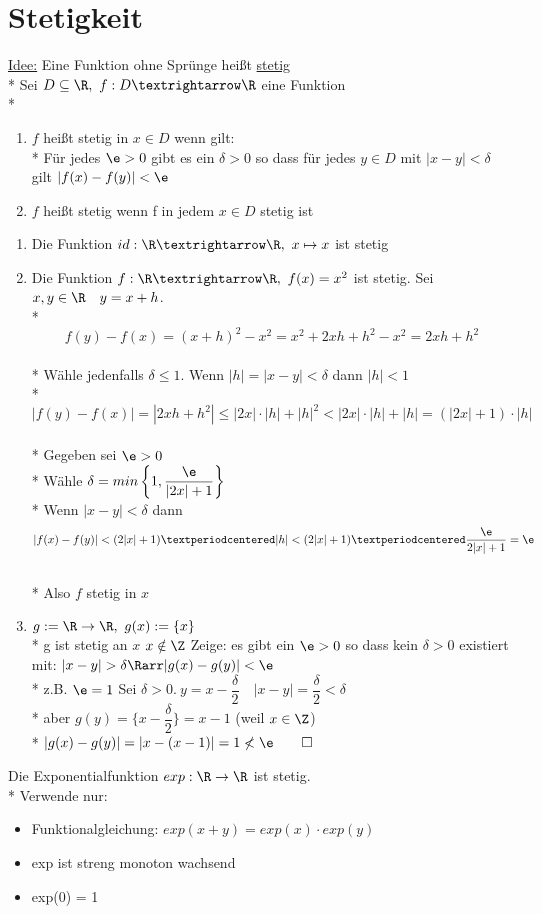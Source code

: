 \chapter{Stetigkeit}
\ul{Idee:} Eine Funktion ohne Sprünge heißt \ul{stetig}\\*
Sei $D\subseteq \R,\ f:D→\R$ eine Funktion\\*
\begin{enumerate}
\item{$f$ heißt stetig in $x\in D$ wenn gilt:\\*
Für jedes $\e>0$ gibt es ein $\delta>0$ so dass für jedes $y\in D$ mit $|x-y|<\delta$ gilt $|f(x)-f(y)|<\e$ %
}
\item{$f$ heißt stetig wenn f in jedem $x\in D$ stetig ist}
\end{enumerate}
\begin{enumerate}
\item{Die Funktion $id:\R→\R,\ x\mapsto x$ ist stetig}
\item{Die Funktion $f:\R→\R,\ f(x)=x^2$ ist stetig. %
\bew
Sei $x,y\in\R\quad y=x+h$.\\*
$$f(y)-f(x)=(x+h)^2-x^2=x^2+2xh+h^2-x^2=2xh+h^2$$\\*
Wähle jedenfalls $\delta\leq 1$. Wenn $|h|=|x-y|<\delta$ dann $|h|<1$\\*
$$|f(y)-f(x)|=|2xh+h^2|\leq|2x|·|h|+|h|^2<|2x|·|h|+|h|=(|2x|+1)·|h|$$\\*
Gegeben sei $\e>0$\\*
Wähle $\delta=min\left\{1,\dfrac{\e}{|2x|+1}\right\}$\\*
Wenn $|x-y|<\delta$ dann $$|f(x)-f(y)|<(2|x|+1)·|h|<(2|x|+1)·\dfrac{\e}{2|x|+1}=\e$$\\*
Also $f$ stetig in $x$}
\item{$g:=\R \to \R,\ g(x):=\{x\}$\\*
g ist stetig an $x$ \equ $x\notin\Z$
Zeige: es gibt ein $\e>0$ so dass kein $\delta>0$ existiert mit: $|x-y|>\delta\Rarr|g(x)-g(y)|<\e$\\*
z.B. $\e=1$ Sei $\delta>0.\ y=x-\dfrac{\delta}{2}\quad |x-y|=\dfrac{\delta}{2}<\delta$\\*
aber $g(y)=\{x-\dfrac{\delta}{2}\}=x-1$ (weil $x\in\Z$)\\*
$|g(x)-g(y)|=|x-(x-1)|=1 \not<\e\qed$}
\end{enumerate}
%
Die Exponentialfunktion $exp: \R \to \R$ ist stetig.\\*
\bew
Verwende nur:
\begin{itemize}
\item{Funktionalgleichung: $exp(x + y) = exp(x) \cdot exp(y)$}
\item{exp ist streng monoton wachsend}
\item{exp(0) = 1}
\end{itemize}
